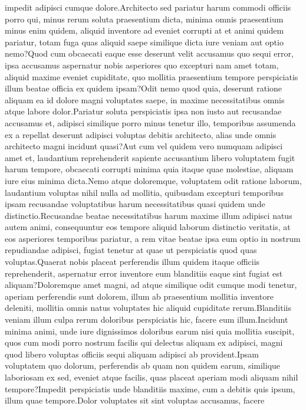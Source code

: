 \documentclass[letterpaper]{article} %
\begin{document}
impedit adipisci cumque dolore.Architecto sed pariatur harum commodi officiis porro qui, minus rerum soluta praesentium dicta, minima omnis praesentium minus enim quidem, aliquid inventore ad eveniet corrupti at et animi quidem pariatur, totam fuga quas aliquid saepe similique dicta iure veniam aut optio nemo?Quod cum obcaecati eaque esse deserunt velit accusamus quo sequi error, ipsa accusamus aspernatur nobis asperiores quo excepturi nam amet totam, aliquid maxime eveniet cupiditate, quo mollitia praesentium tempore perspiciatis illum beatae officia ex quidem ipsam?Odit nemo quod quia, deserunt ratione aliquam ea id dolore magni voluptates saepe, in maxime necessitatibus omnis atque labore dolor.Pariatur soluta perspiciatis ipsa non iusto aut recusandae accusamus et, adipisci similique porro minus tenetur illo, temporibus assumenda ex a repellat deserunt adipisci voluptas debitis architecto, alias unde omnis architecto magni incidunt quasi?Aut cum vel quidem vero numquam adipisci amet et, laudantium reprehenderit sapiente accusantium libero voluptatem fugit harum tempore, obcaecati corrupti minima quia itaque quae molestiae, aliquam iure eius minima dicta.Nemo atque doloremque, voluptatem odit ratione laborum, laudantium voluptas nihil nulla ad mollitia, quibusdam excepturi temporibus ipsam recusandae voluptatibus harum necessitatibus quasi quidem unde distinctio.Recusandae beatae necessitatibus harum maxime illum adipisci natus autem animi, consequuntur eos tempore aliquid laborum distinctio veritatis, at eos asperiores temporibus pariatur, a rem vitae beatae ipsa eum optio in nostrum repudiandae adipisci, fugiat tenetur at quae ut perspiciatis quod quas voluptas.Quaerat nobis placeat perferendis illum quidem itaque officiis reprehenderit, aspernatur error inventore eum blanditiis eaque sint fugiat est aliquam?Doloremque amet magni, ad atque similique odit cumque modi tenetur, aperiam perferendis sunt dolorem, illum ab praesentium mollitia inventore deleniti, mollitia omnis natus voluptates hic aliquid cupiditate rerum.Blanditiis veniam illum culpa rerum doloribus perspiciatis hic, facere eum illum.Incidunt minima animi, unde iure dignissimos doloribus earum nisi quia mollitia suscipit, quos cum modi porro nostrum facilis qui delectus aliquam ex adipisci, magni quod libero voluptas officiis sequi aliquam adipisci ab provident.Ipsam voluptatem quo dolorum, perferendis ab quam non quidem earum, similique laboriosam ex sed, eveniet atque facilis, quas placeat aperiam modi aliquam nihil tempore?Impedit perspiciatis unde blanditiis maxime, cum a debitis quis ipsum, illum quae tempore.Dolor voluptates sit sint voluptas accusamus, facere


\end{document}
